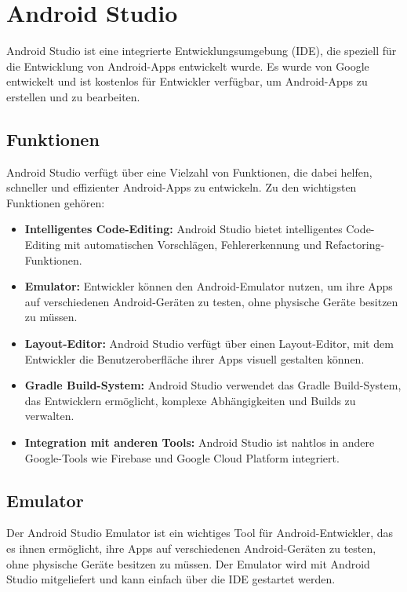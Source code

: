     \section{Android Studio}
    Android Studio ist eine integrierte Entwicklungsumgebung (IDE), die speziell für die Entwicklung von Android-Apps entwickelt wurde. 
    Es wurde von Google entwickelt und ist kostenlos für Entwickler verfügbar, um Android-Apps zu erstellen und zu bearbeiten.

    \subsection{Funktionen}
    Android Studio verfügt über eine Vielzahl von Funktionen, die dabei helfen, schneller und effizienter Android-Apps zu entwickeln. Zu den wichtigsten Funktionen gehören:

    \begin{itemize}
        \item \textbf{Intelligentes Code-Editing:} Android Studio bietet intelligentes Code-Editing mit automatischen Vorschlägen, Fehlererkennung und Refactoring-Funktionen.
        \item \textbf{Emulator:} Entwickler können den Android-Emulator nutzen, um ihre Apps auf verschiedenen Android-Geräten zu testen, ohne physische Geräte besitzen zu müssen.
        \item \textbf{Layout-Editor:} Android Studio verfügt über einen Layout-Editor, mit dem Entwickler die Benutzeroberfläche ihrer Apps visuell gestalten können.
        \item \textbf{Gradle Build-System:} Android Studio verwendet das Gradle Build-System, das Entwicklern ermöglicht, komplexe Abhängigkeiten und Builds zu verwalten.
        \item \textbf{Integration mit anderen Tools:} Android Studio ist nahtlos in andere Google-Tools wie Firebase und Google Cloud Platform integriert.
        \end{itemize}

    \subsection{Emulator}
    Der Android Studio Emulator ist ein wichtiges Tool für Android-Entwickler, das es ihnen ermöglicht, ihre Apps auf verschiedenen Android-Geräten zu testen, ohne physische Geräte besitzen zu müssen. Der Emulator wird mit Android Studio mitgeliefert und kann einfach über die IDE gestartet werden.

